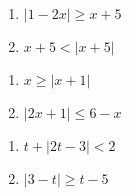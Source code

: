 \begin{multicols}{2}
\begin{enumerate}
\setcounter{enumi}{\value{HW}}

\item $|1-2x| \geq x + 5$
\item  $x + 5 <  |x+5|$ 

\setcounter{HW}{\value{enumi}}
\end{enumerate}
\end{multicols}

\begin{multicols}{2}
\begin{enumerate}
\setcounter{enumi}{\value{HW}}

\item  $x \geq |x+1|$ 
\item   $|2x + 1| \leq 6-x$   

\setcounter{HW}{\value{enumi}}
\end{enumerate}
\end{multicols}

\begin{multicols}{2}
\begin{enumerate}
\setcounter{enumi}{\value{HW}}

\item  $t + |2t-3| < 2$  
\item  $|3-t| \geq t-5$  \label{solveinequabslast}

\setcounter{HW}{\value{enumi}}
\end{enumerate}
\end{multicols}

